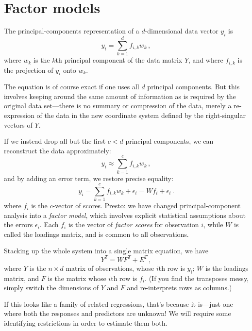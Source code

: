\documentclass{mynotes}
\begin{document}
\newpage

\section{Factor models}

The principal-components representation of a $d$-dimensional data vector $y_i$ is
$$
y_i = \sum_{k=1}^d f_{i,k} w_k \, ,
$$
where $w_k$ is the $k$th principal component of the data matrix $Y$, and where $f_{i,k}$ is the projection of $y_i$ onto $w_k$.

The equation is of course exact if one uses all $d$ principal components.  But this involves keeping around the same amount of information as is required by the original data set---there is no summary or compression of the data, merely a re-expression of the data in the new coordinate system defined by the right-singular vectors of $Y$.

If we instead drop all but the first $c < d$ principal components, we can reconstruct the data approximately:
$$
y_i \approx \sum_{k=1}^c f_{i,k} w_k \, ,
$$
and by adding an error term, we restore precise equality:
$$
y_i =	 \sum_{k=1}^c f_{i,k} w_k  + \epsilon_i = W f_i + \epsilon_i \, .
$$
where $f_i$ is the $c$-vector of scores.  Presto: we have changed principal-component analysis into a \textit{factor model}, which involves explicit statistical assumptions about the errors $\epsilon_i$.   Each $f_i$ is the vector of \textit{factor scores} for observation $i$, while $W$ is called the loadings matrix, and is common to all observations.

Stacking up the whole system into a single matrix equation, we have
$$
Y^T = W F^T + E^T \, ,
$$
where $Y$ is the $n \times d$ matrix of observations, whose $i$th row is $y_i$; $W$ is the loadings matrix, and $F$ is the matrix whose $i$th row is $f_i$.  (If you find the transposes messy, simply switch the dimensions of $Y$ and $F$ and re-interprets rows as columns.)

If this looks like a family of related regressions, that's because it is---just one where both the responses and predictors are unknown!  We will require some identifying restrictions in order to estimate them both.
\end{document}
